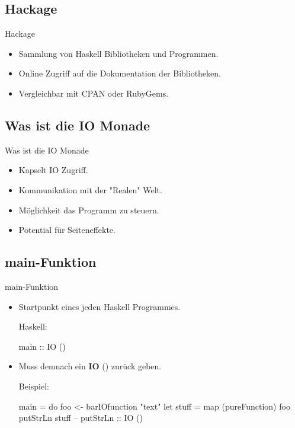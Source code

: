 \documentclass{beamer}
\begin{document}
\subsection{Hackage}
\begin{frame}[<+->]{Hackage}
\begin{itemize}
\item Sammlung von Haskell Bibliotheken und Programmen.
\item Online Zugriff auf die Dokumentation der Bibliotheken.
\item Vergleichbar mit CPAN oder RubyGems.
\end{itemize}
\end{frame}

\subsection{Was ist die IO Monade}
\begin{frame}[<+->]{Was ist die IO Monade}
\begin{itemize}
\item Kapselt IO Zugriff.
\item Kommunikation mit der "Realen" Welt.
\item M\"oglichkeit das Programm zu steuern.
\item Potential f\"ur Seiteneffekte.
\end{itemize}
\end{frame}

\subsection{main-Funktion}
\begin{frame}[<+->][fragile]{main-Funktion}
\begin{itemize}
\item Startpunkt eines jeden Haskell Programmes.
\begin{block}{Haskell:}
\begin{haskell}
main :: IO ()
\end{haskell}
\end{block}
\item Muss demnach ein \textbf{IO} () zurück geben.
\begin{block}{Beispiel:}
\begin{haskell}
main = do 
  foo <- barIOfunction "text"
  let stuff = map (pureFunction) foo
  putStrLn stuff -- putStrLn :: IO ()
\end{haskell}
\end{block}
\end{itemize}
\end{frame}
\end{document}
